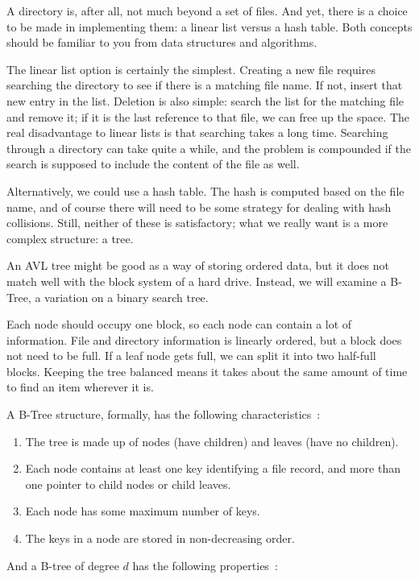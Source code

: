 A directory is, after all, not much beyond a set of files. And yet, there is a choice to be made in implementing them: a linear list versus a hash table. Both concepts should be familiar to you from data structures and algorithms.

The linear list option is certainly the simplest. Creating a new file requires searching the directory to see if there is a matching file name. If not, insert that new entry in the list. Deletion is also simple: search the list for the matching file and remove it; if it is the last reference to that file, we can free up the space. The real disadvantage to linear lists is that searching takes a long time. Searching through a directory can take quite a while, and the problem is compounded if the search is supposed to include the content of the file as well.

Alternatively, we could use a hash table. The hash is computed based on the file name, and of course there will need to be some strategy for dealing with hash collisions. Still, neither of these is satisfactory; what we really want is a more complex structure: a tree.

An AVL tree might be good as a way of storing ordered data, but it does not match well with the block system of a hard drive. Instead, we will examine a B-Tree, a variation on a binary search tree. 

Each node should occupy one block, so each node can contain a lot of information. File and directory information is linearly ordered, but a block does not need to be full. If a leaf node gets full, we can split it into two half-full blocks. Keeping the tree balanced means it takes about the same amount of time to find an item wherever it is.

A B-Tree structure, formally, has the following characteristics~\cite{osi}:

\begin{enumerate}
	\item The tree is made up of nodes (have children) and leaves (have no children).
	\item Each node contains at least one key identifying a file record, and more than one pointer to child nodes or child leaves.
	\item Each node has some maximum number of keys.
	\item The keys in a node are stored in non-decreasing order.
\end{enumerate}

And a B-tree of degree $d$ has the following properties~\cite{osi}:

